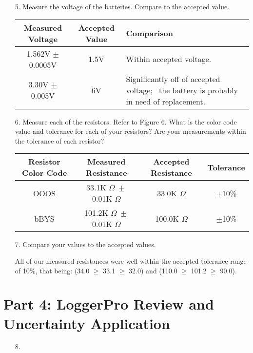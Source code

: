 \documentclass[12pt, letterpaper]{article}
\begin{document}
    \begin{enumerate}
        \item [5.] Measure the voltage of the batteries. Compare to the accepted value.
        
        \begin{mdframed}
            \begin{tabular}{|c|c|p{3in}|}
                \hline
                Measured Voltage & Accepted Value & Comparison  \\
                \hline
                1.562V $\pm$ 0.0005V & 1.5V & Within accepted voltage.  \\
                \hline
                3.30V $\pm$ 0.005V & 6V & Significantly off of accepted voltage; \ the battery is probably in need of replacement. \\
                \hline
            \end{tabular}
        \end{mdframed}

        \item[6.] Measure each of the resistors. Refer to Figure 6. What is the color code value and tolerance for each of your resistors? Are your measurements within the tolerance of each resistor?
        
        \begin{mdframed}
            \begin{center}
                \begin{tabular}{|c|c|c|c|}
                    \hline
                    Resistor Color Code & Measured Resistance & Accepted Resistance & Tolerance \\
                    \hline
                    OOOS & 33.1K $\Omega\; \pm$ 0.01K $\Omega$ & 33.0K $\Omega$ & $\pm$10\%     \\
                    \hline
                    bBYS & 101.2K $\Omega\; \pm$ 0.01K $\Omega$ & 100.0K $\Omega$ & $\pm$10\%   \\
                    \hline
                \end{tabular}    
            \end{center}
        \end{mdframed}

        \item[7.] Compare your values to the accepted values.
        
        \begin{mdframed}
            All of our measured resistances were well within the accepted tolerance range of 10\%, that being: (34.0 $\geq$ 33.1 $\geq$ 32.0) and (110.0 $\geq$ 101.2 $\geq$ 90.0).
        \end{mdframed}
    \end{enumerate}

    \section*{Part 4: LoggerPro Review and Uncertainty Application}
    \begin{enumerate}
        \item [8.] 
    \end{enumerate}
\end{document}
